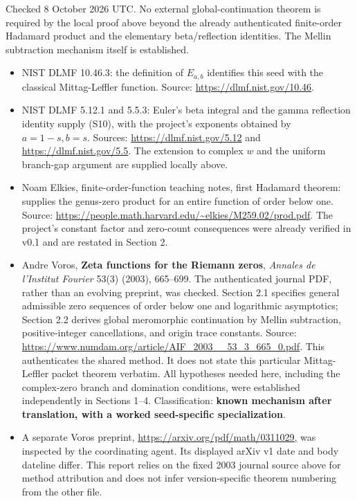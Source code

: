 Checked 8 October 2026 UTC. No external global-continuation theorem is
required by the local proof above beyond the already authenticated
finite-order Hadamard product and the elementary beta/reflection
identities. The Mellin subtraction mechanism itself is established.

\begin{itemize}
\tightlist
\item
  NIST DLMF 10.46.3: the definition of \(E_{a,b}\) identifies this seed
  with the classical Mittag-Leffler function. Source:
  \url{https://dlmf.nist.gov/10.46}.
\item
  NIST DLMF 5.12.1 and 5.5.3: Euler's beta integral and the gamma
  reflection identity supply (S10), with the project's exponents
  obtained by \(a=1-s,b=s\). Sources: \url{https://dlmf.nist.gov/5.12} and
  \url{https://dlmf.nist.gov/5.5}. The extension to complex \(w\) and the
  uniform branch-gap argument are supplied locally above.
\item
  Noam Elkies, finite-order-function teaching notes, first Hadamard
  theorem: supplies the genus-zero product for an entire function of
  order below one. Source:
  \url{https://people.math.harvard.edu/~elkies/M259.02/prod.pdf}.
  The project's constant factor and zero-count consequences were already
  verified in v0.1 and are restated in Section 2.
\item
  Andre Voros, \textbf{Zeta functions for the Riemann zeros},
  \emph{Annales de l'Institut Fourier} 53(3) (2003), 665--699. The
  authenticated journal PDF, rather than an evolving preprint, was
  checked. Section 2.1 specifies general admissible zero sequences of
  order below one and logarithmic asymptotics; Section 2.2 derives
  global meromorphic continuation by Mellin subtraction,
  positive-integer cancellations, and origin trace constants. Source:
  \url{https://www.numdam.org/article/AIF_2003__53_3_665_0.pdf}. This
  authenticates the shared method. It does not state this particular
  Mittag-Leffler packet theorem verbatim. All hypotheses needed here,
  including the complex-zero branch and domination conditions, were
  established independently in Sections 1--4. Classification:
  \textbf{known mechanism after translation, with a worked seed-specific
  specialization}.
\item
  A separate Voros preprint, \url{https://arxiv.org/pdf/math/0311029,} was
  inspected by the coordinating agent. Its displayed arXiv v1 date and
  body dateline differ. This report relies on the fixed 2003 journal
  source above for method attribution and does not infer
  version-specific theorem numbering from the other file.
\end{itemize}

